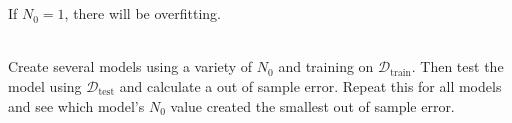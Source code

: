 \documentclass[12pt]{article}
\begin{document}
\begin{enumerate}
~


 \\
If $N_0 = 1$, there will be overfitting. 

 \\
Create several models using a variety of $N_0$ and training on $\mathcal{D}_{\text{train}}$. Then test the model using $\mathcal{D}_{\text{test}}$ and calculate a out of sample error. Repeat this for all models and see which model's $N_0$ value created the smallest out of sample error. 


\end{enumerate} \newpage


\end{document}
